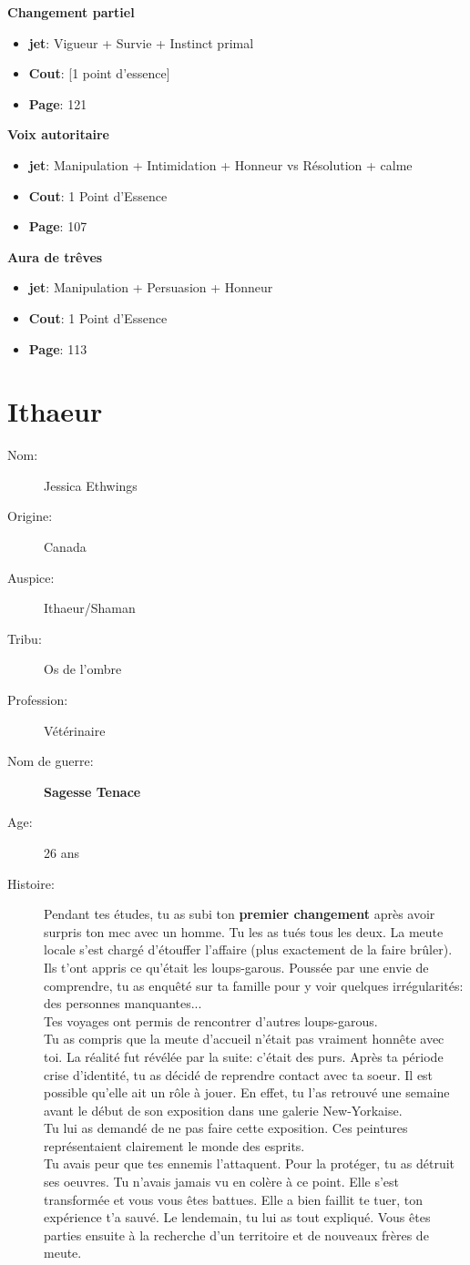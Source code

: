 \documentclass[oneside,12pt]{book}
\newcommand\don[5]{
\textbf{#1} \\
#2
\begin{itemize}
\item{ \textbf{jet}: #3}
\item{ \textbf{Cout}: #4}
\item{ \textbf{Page}: #5}
\end{itemize}
\vspace{0.5cm}
}
\newcommand{\Jessica}{\textbf{Sagesse Tenace} }
\begin{document}
\begin{flushleft}
\don{Changement partiel}{}{Vigueur + Survie + Instinct primal}{[1 point d'essence]}{121}
\don{Voix autoritaire}{}{ Manipulation + Intimidation + Honneur vs Résolution + calme}{1 Point d'Essence}{107}
\don{Aura de trêves}{}{Manipulation + Persuasion + Honneur}{1 Point d'Essence}{113}


\clearpage
\section{Ithaeur}
\begin{description}
\item[Nom:]{Jessica Ethwings}
\item[Origine:]{Canada}
\item[Auspice:]{Ithaeur/Shaman}
\item[Tribu:]{Os de l'ombre}
\item[Profession:]{Vétérinaire}
\item[Nom de guerre:]{\Jessica}
\item[Age:]{26 ans}
\item[Histoire:]{ 
Pendant tes études, tu as subi ton \textbf{premier changement} après avoir surpris ton mec avec un homme. Tu les as tués tous les deux.
La meute locale s'est chargé d'étouffer l'affaire (plus exactement de la faire brûler).\\
Ils t'ont appris ce qu'était les loups-garous. Poussée par une envie de comprendre, tu as enquêté sur ta famille pour y voir quelques irrégularités: des personnes manquantes...\\
Tes voyages ont permis de rencontrer d'autres loups-garous.\\
Tu as compris que la meute d'accueil n'était pas vraiment honnête avec toi. La réalité fut révélée par la suite: c'était des purs.
Après ta période crise d'identité, tu as décidé de reprendre contact avec ta soeur. Il est possible qu'elle ait un rôle à jouer.
En effet, tu l'as retrouvé une semaine avant le début de son exposition dans une galerie New-Yorkaise.\\
Tu lui as demandé de ne pas faire cette exposition. Ces peintures représentaient clairement le monde des esprits.\\
Tu avais peur que tes ennemis l'attaquent. Pour la protéger, tu as détruit ses oeuvres. Tu n'avais jamais vu en colère à ce point.
Elle s'est transformée et vous vous êtes battues. Elle a bien faillit te tuer, ton expérience t'a sauvé. Le lendemain, tu lui as tout expliqué.
Vous êtes parties ensuite à la recherche d'un territoire et de nouveaux frères de meute.\\
}
\end{description}
\end{flushleft}
\end{document}
